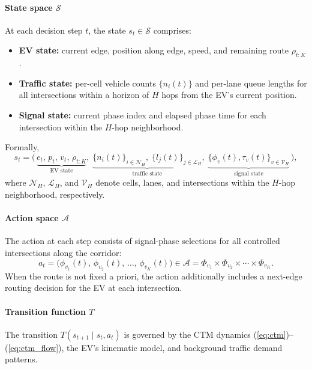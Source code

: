 \documentclass[journal]{IEEEtran}
\begin{document}
\paragraph{State space $\mathcal{S}$}
At each decision step $t$, the state $s_t \in \mathcal{S}$ comprises:
\begin{itemize}
  \item \textbf{EV state:} current edge, position along edge, speed,
    and remaining route $\rho_{t:K}$.
  \item \textbf{Traffic state:} per-cell vehicle counts
    $\{n_i(t)\}$ and per-lane queue lengths for all intersections
    within a horizon of $H$ hops from the EV's current position.
  \item \textbf{Signal state:} current phase index and elapsed phase
    time for each intersection within the $H$-hop neighborhood.
\end{itemize}
Formally,
\begin{equation}
  s_t = \bigl(\,
    \underbrace{e_t,\, p_t,\, v_t,\, \rho_{t:K}}_{\text{EV state}},\;
    \underbrace{\{n_i(t)\}_{i \in \mathcal{N}_H},\;
                \{l_j(t)\}_{j \in \mathcal{L}_H}}_{\text{traffic state}},\;
    \underbrace{\{\phi_v(t), \tau_v(t)\}_{v \in \mathcal{V}_H}}_{\text{signal state}}
  \,\bigr),
  \label{eq:state}
\end{equation}
where $\mathcal{N}_H$, $\mathcal{L}_H$, and $\mathcal{V}_H$ denote
cells, lanes, and intersections within the $H$-hop neighborhood,
respectively.

\paragraph{Action space $\mathcal{A}$}
The action at each step consists of signal-phase selections for all
controlled intersections along the corridor:
\begin{equation}
  a_t = \bigl(\phi_{v_1}(t),\, \phi_{v_2}(t),\, \ldots,\,
         \phi_{v_K}(t)\bigr) \in \mathcal{A}
         = \Phi_{v_1} \times \Phi_{v_2} \times \cdots \times \Phi_{v_K}.
  \label{eq:action}
\end{equation}
When the route is not fixed a priori, the action additionally includes
a next-edge routing decision for the EV at each intersection.

\paragraph{Transition function $T$}
The transition $T(s_{t+1} \mid s_t, a_t)$ is governed by the CTM
dynamics (\ref{eq:ctm})--(\ref{eq:ctm_flow}), the EV's kinematic
model, and background traffic demand patterns.
\end{document}
